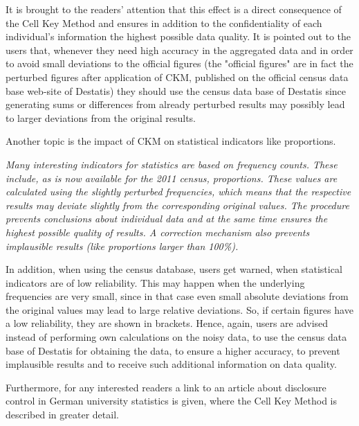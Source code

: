 It is brought to the readers’ attention that this effect is a direct consequence of the Cell Key Method and ensures in addition to the confidentiality of each individual’s information the highest possible data quality. It is pointed out to the users that, whenever they need high accuracy in the aggregated data and in order to avoid small deviations to the official figures (the "official figures" are in fact the perturbed figures after application of CKM, published on the official census data base web-site of Destatis) they should use the census data base of Destatis since generating sums or differences from already perturbed results may possibly lead to larger deviations from the original results.

Another topic is the impact of CKM on statistical indicators like proportions.

\begin{mdframed}

\textit{Many interesting indicators for statistics are based on frequency counts. These include, as is now available for the 2011 census, proportions. These values are calculated using the slightly perturbed frequencies, which means that the respective results may deviate slightly from the corresponding original values. The procedure prevents conclusions about individual data and at the same time ensures the highest possible quality of results. A correction mechanism also prevents implausible results (like proportions larger than 100\%). 
}

\end{mdframed}


In addition, when using the census database,  users get warned, when statistical indicators are of low reliability. This may happen when the underlying frequencies are very small, since in that case even small absolute deviations from the original values may lead to large relative deviations. So, if certain figures have a low reliability, they are shown in brackets. Hence, again, users are advised instead of performing own calculations on the noisy data, to use the census data base of Destatis for obtaining the data, to ensure a higher accuracy, to prevent implausible results and to receive such additional information on data quality.

Furthermore, for any interested readers a link to an article about disclosure control in German university statistics is given, where the Cell Key Method is described in greater detail.






